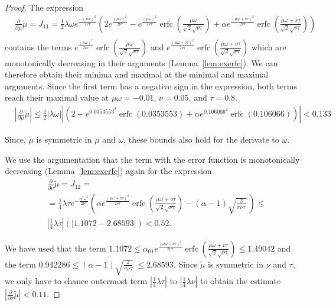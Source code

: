 \documentclass{article}
\newcommand\munn{{\tilde \mu}}
\renewcommand{\leq}{\leqslant}
\DeclareMathOperator{\erfc}{erfc}
\begin{document}
\begin{proof}
The expression
\begin{align}
 & \frac{\partial}{\partial \mu} \munn = J_{11} = \frac{1}{2}\lambda\omega e^{\frac{-(\mu\omega)^{2}}{2\nu\tau}}\left(2e^{\frac{(\mu\omega)^{2}}{2\nu\tau}}-
 e^{\frac{(\mu\omega)^{2}}{2\nu\tau}}\erfc \left(\frac{\mu\omega}{\sqrt{2}\sqrt{\nu\tau}}\right)+
 \alpha e^{\frac{(\mu\omega+\nu\tau)^{2}}{2\nu\tau}}\erfc\left(\frac{\mu\omega+\nu\tau}{\sqrt{2}\sqrt{\nu\tau}}\right)\right) \\ \nonumber
\end{align}
contains the terms $e^{\frac{(\mu\omega)^{2}}{2\nu\tau}}\erfc \left(\frac{\mu\omega}{\sqrt{2}\sqrt{\nu\tau}}\right)$
and $e^{\frac{(\mu\omega+\nu\tau)^{2}}{2\nu\tau}}\erfc\left(\frac{\mu\omega+\nu\tau}{\sqrt{2}\sqrt{\nu\tau}}\right)$
which are monotonically decreasing in their arguments (Lemma~\ref{lem:exerfc}). We can therefore obtain their
minima and maximal at the minimal and maximal arguments. Since the first term has a negative sign in the expression, both terms
reach their maximal value at $\mu \omega=-0.01$, $\nu = 0.05$, and $\tau=0.8$. 
\begin{align}
 & \left| \frac{\partial}{\partial \mu} \munn \right| \leq    \frac{1}{2} \left| \lambda\omega \right| \left| \left(2 -
  e^{0.0353553^2}\erfc \left(0.0353553 \right)  +
 \alpha e^{0.106066^2}\erfc\left(0.106066\right)\right) \right| <  0.133
\end{align}

Since, $\munn$ is symmetric in $\mu$ and $\omega$, these bounds also hold for the derivate to $\omega$.

We use the argumentation that the term with the error function is monotonically decreasing (Lemma~\ref{lem:exerfc})
again for the expression
\begin{align}
 & \frac{\partial}{\partial \nu} \munn = J_{12} = \\ \nonumber
 & =\frac{1}{4}\lambda\tau e^{-\frac{\mu^{2}\omega^{2}}{2\nu\tau}} \left(
 \alpha e^{\frac{(\mu\omega+\nu\tau)^{2}}{2\nu\tau}} \erfc \left(\frac{\mu\omega+\nu\tau}{\sqrt{2}\sqrt{\nu\tau}}\right)
 -(\alpha-1)\sqrt{\frac{2}{\pi\nu\tau}}\ \right) \leq \\ \nonumber
 & \left| \frac{1}{4}\lambda \tau \right| 
 \left( \left| 1.1072 -  2.68593   \right| \right) <  0.52.  
\end{align}

We have used that the term $1.1072 \leq \alpha_{\mathrm{01}} e^{\frac{(\mu\omega+\nu\tau)^{2}}{2\nu\tau}} \erfc \left(\frac{\mu\omega+\nu\tau}{\sqrt{2}\sqrt{\nu\tau}}\right) \leq 1.49042$
and the term $0.942286 \leq (\alpha-1)\sqrt{\frac{2}{\pi\nu\tau}}\  \leq 2.68593$.
Since $\munn$ is symmetric in $\nu$ and $\tau$, we only have to chance outermost
term $\left| \frac{1}{4}\lambda \tau \right|$ to  $\left| \frac{1}{4}\lambda \nu \right|$ to 
obtain the estimate $\left| \frac{\partial}{\partial \tau} \munn \right| < 0.11$.


\end{proof}
\end{document}
